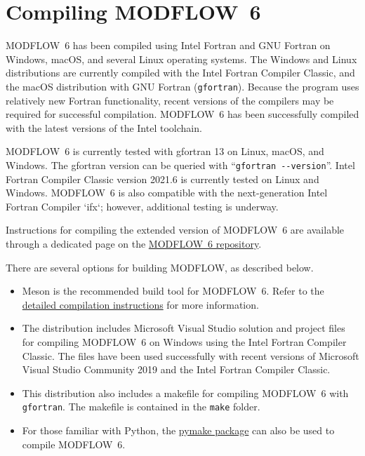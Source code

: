 \documentclass[11pt,twoside,twocolumn]{usgsreport}
\begin{document}
\section{Compiling MODFLOW~6}
MODFLOW~6 has been compiled using Intel Fortran and GNU Fortran on Windows, macOS, and several Linux operating systems. The Windows and Linux distributions are currently compiled with the Intel Fortran Compiler Classic, and the macOS distribution with GNU Fortran (\texttt{gfortran}). Because the program uses relatively new Fortran functionality, recent versions of the compilers may be required for successful compilation. MODFLOW~6 has been successfully compiled with the latest versions of the Intel toolchain.

MODFLOW~6 is currently tested with gfortran 13 on Linux, macOS, and Windows. The gfortran version can be queried with ``\verb|gfortran --version|''.  Intel Fortran Compiler Classic version 2021.6 is currently tested on Linux and Windows. MODFLOW~6 is also compatible with the next-generation Intel Fortran Compiler `ifx`; however, additional testing is underway.

Instructions for compiling the extended version of MODFLOW~6 are available through a dedicated page on the \href{https://github.com/MODFLOW-ORG/modflow6/wiki/Extended-MODFLOW-User-Guide}{MODFLOW~6 repository}.

There are several options for building MODFLOW, as described below.

\begin{itemize}

\item Meson is the recommended build tool for MODFLOW~6.  Refer to the \href{https://github.com/MODFLOW-ORG/modflow6/blob/develop/DEVELOPER.md#building}{detailed compilation instructions} for more information.

\item The distribution includes Microsoft Visual Studio solution and project files for compiling MODFLOW~6 on Windows using the Intel Fortran Compiler Classic.  The files have been used successfully with recent versions of Microsoft Visual Studio Community 2019 and the Intel Fortran Compiler Classic.

\item This distribution also includes a makefile for compiling MODFLOW~6 with \texttt{gfortran}.  The makefile is contained in the \texttt{make} folder.

\item For those familiar with Python, the \href{https://github.com/modflowpy/pymake}{pymake package} can also be used to compile MODFLOW~6.

\end{itemize}
\end{document}

